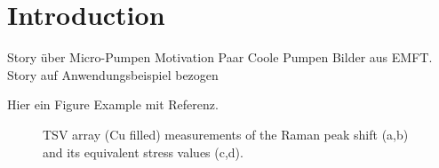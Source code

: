 \chapter{Introduction}
\label{sec:introduction}

Story über Micro-Pumpen
Motivation
Paar Coole Pumpen Bilder aus EMFT.
Story auf Anwendungsbeispiel bezogen

Hier ein Figure Example mit Referenz.

\begin{figure}[htb]
  \centering  
  \caption{TSV array (Cu filled) measurements of the Raman peak shift (a,b) and its equivalent stress values (c,d). \citep{yoo_multiwavelength_2014}}
  \label{fig:TSVarray}
\end{figure}




